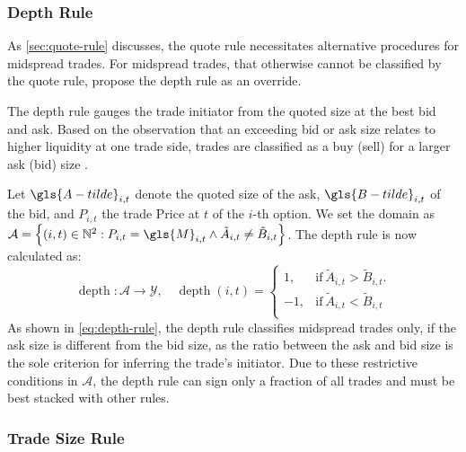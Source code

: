 \subsubsection{Depth Rule}\label{sec:depth-rule}

As \cref{sec:quote-rule} discusses, the quote rule necessitates alternative procedures for midspread trades. For midspread trades, that otherwise cannot be classified by the quote rule, \textcite[][14]{grauerOptionTradeClassification2022} propose the depth rule as an override.

The depth rule gauges the trade initiator from the quoted size at the best bid and ask. Based on the observation that an exceeding bid or ask size relates to higher liquidity at one trade side, trades are classified as a buy (sell) for a larger ask (bid) size \autocite[][14]{grauerOptionTradeClassification2022}.

Let $\gls{A-tilde}_{i,t}$ denote the quoted size of the ask, $\gls{B-tilde}_{i,t}$ of the bid, and $P_{i,t}$ the trade Price at $t$ of the $i$-th option. We set the domain as $\mathcal{A} = \left\{(i, t) \in \mathbb{N}^2: P_{i,t} = \gls{M}_{i,t} \land \tilde{A}_{i,t} \neq \tilde{B}_{i,t} \right\}$. The depth rule is now calculated as:
\begin{equation}
    \operatorname{depth} \colon \mathcal{A} \to \mathcal{Y},\quad
    \operatorname{depth}(i, t)=
    \begin{cases}
        1,  & \mathrm{if}\ \tilde{A}_{i,t} > \tilde{B}_{i,t}. \\
        -1, & \mathrm{if}\ \tilde{A}_{i,t} < \tilde{B}_{i,t}\\
    \end{cases}
    \label{eq:depth-rule}
\end{equation}
As shown in \cref{eq:depth-rule}, the depth rule classifies midspread trades only, if the ask size is different from the bid size, as the ratio between the ask and bid size is the sole criterion for inferring the trade's initiator. Due to these restrictive conditions in $\mathcal{A}$, the depth rule can sign only a fraction of all trades and must be best stacked with other rules.

\subsubsection{Trade Size Rule}\label{sec:trade-size-rule}

